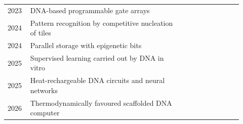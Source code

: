 \begin{center}
\begin{longtable}{@{}p{0.08\linewidth}p{0.62\linewidth}p{0.22\linewidth}@{}}
2023 & DNA-based programmable gate arrays & \cite{Lv2023}\\
2024 & Pattern recognition by competitive nucleation of tiles & \cite{Evans2024}\\
2024 & Parallel storage with epigenetic bits & \cite{ZhangC2024}\\
2025 & Supervised learning carried out by DNA in vitro & \cite{CherryQian2025}\\
2025 & Heat-rechargeable DNA circuits and neural networks & \cite{SongQian2025}\\
2026 & Thermodynamically favoured scaffolded DNA computer & \cite{Sterin2026}\\
\bottomrule
\end{longtable}
\end{center}
